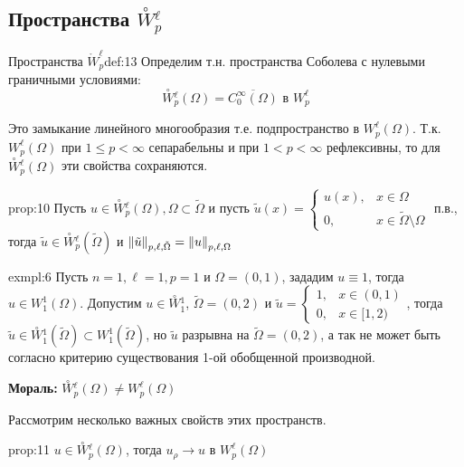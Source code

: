 \documentclass[12pt,a4paper]{article}
\newcommand{\zeroW}[2]{\overset{\circ}{W}{}_{#1}^{#2}}
\begin{document}
\subsection{Пространства $\zeroW{p}{\ell}$}

\begin{definition}{Пространства $\mathring{W}_p^\ell$}{def:13} 
	Определим т.н. пространства Соболева с нулевыми граничными условиями:
	\begin{equation*}
		\zeroW{p}{\ell} (\Omega) = \overline{C_0^\infty (\Omega)} \text{ в } W_p^\ell
	\end{equation*}
\end{definition}

Это замыкание линейного многообразия т.е. подпространство в $W_p^\ell (\Omega)$. Т.к. $W_p^\ell (\Omega)$ при $1 \leq p < \infty$ сепарабельны и при $1 < p < \infty$ рефлексивны, то для $\zeroW{p}{\ell} (\Omega)$ эти свойства сохраняются.

\begin{proposition}{}{prop:10}
	Пусть $u \in \zeroW{p}{\ell} (\Omega), \Omega \subset \tilde{\Omega}$ и пусть
	$\tilde{u} (x) = 
		\begin{cases}
			u(x), &x \in \Omega \\
			0, &x \in \tilde{\Omega} \setminus \Omega
	 	\end{cases}$ п.в., тогда $\tilde{u} \in \zeroW{p}{\ell} (\tilde{\Omega})$ и $\norm{\tilde{u}}_{p, \ell, \tilde{\Omega}} = \norm{u}_{p, \ell, \Omega}$
\end{proposition}

\begin{example}{}{exmpl:6}
	Пусть $n = 1, \ell = 1, p = 1$ и $\Omega = (0, 1)$, зададим $u \equiv 1$, тогда $u \in W_1^1 (\Omega)$. Допустим $u \in \zeroW{1}{1}$, $\tilde{\Omega} = (0, 2)$ и 
	$\tilde{u} = 
		\begin{cases}
			1, &x \in (0, 1) \\
			0, &x \in [1, 2)
		\end{cases}$, тогда \\ $\tilde{u} \in \zeroW{1}{1}(\tilde{\Omega}) \subset W_1^1 (\tilde{\Omega})$, но $\tilde{u}$ разрывна на $\tilde{\Omega} = (0, 2)$, а так не может быть согласно критерию существования 1-ой обобщенной производной.
\end{example}
\textbf{Мораль:} $\zeroW{p}{\ell} (\Omega) \neq W_p^\ell (\Omega)$

Рассмотрим несколько важных свойств этих пространств.
\begin{proposition}{}{prop:11}
	$u \in \zeroW{p}{\ell} (\Omega)$, тогда $u_\rho \to u$ в $W_p^\ell (\Omega)$
\end{proposition}
\end{document}
